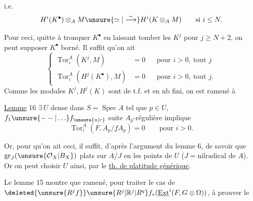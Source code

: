 i.e.
\[
 H^i(K^\bullet)\otimes_A M\unsure{\simeq|\overset{\sim}{\longrightarrow}} H^i(K\otimes_A M)\qquad\text{si }i\leq N.
\]

Pour ceci, quitte à tronquer $K^\bullet$ en laissant tomber les $K^j$ pour $j\geq N+2$, on peut supposer $K^\bullet$ borné. Il suffit qu'on ait
\[
 \left\{\begin{aligned}
 \operatorname{Tor}^A_i(K^j,M)&=0 &&\text{pour }i>0,\ \text{tout }j\\
 \operatorname{Tor}^A_i(H^j(K^\bullet),M)&=0 &&\text{pour }i>0,\ \text{tout }j.
 \end{aligned}\right.
\]
Comme les modules $K^j,H^j(K)$ sont de t.f. et en nb fini, on est ramené à  

\uline{Lemme} 16  $\exists\,U$ dense dans $S=\operatorname{Spec}A$ tel que $p\in U$, $f_1\unsure{--|\ldots} f_{\unsure{n|r}}$  suite $A_p$-régulière implique
\[
 \operatorname{Tor}^A_i(F,A_p/\underline f A_p)=0\qquad\text{pour }i>0.
\]

Or, pour qu'on ait ceci, il suffit, d'après l'argument  du lemme 6, de savoir que $\operatorname{gr}_J(\unsure{\mathcal O_X|B_X})$   plats sur $A/J$ en les points de $U$ ($J=\text{nilradical de } A$). Or on peut choisir $U$ ainsi, par le \uline{th. de platitude générique}.

Le lemme 15 montre que   ramené, pour traiter le cas de $\deleted{\unsure{R^j f}}\unsure{R^j|\mathbb R^j|R^q}f_*(\underline{\operatorname{Ext}}^i(F,G\otimes\Omega))$,  à prouver le

